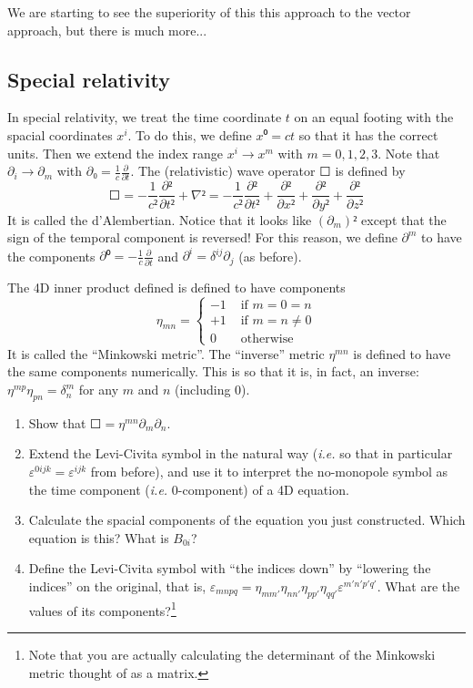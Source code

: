 We are starting to see the superiority of this this approach to the vector approach, but there is much more...

\subsection{Special relativity}
In special relativity, we treat the time coordinate $t$ on an equal footing with the spacial coordinates $x^i$. To do this, we define $x⁰ = ct$ so that it has the correct units. Then we extend the index range $x^i → x^m$ with $m=0,1,2,3$. Note that $∂_i → ∂_m$ with $∂₀ = \frac1c \frac ∂{∂t}$. The (relativistic) wave operator $☐$ is defined by 
$$
☐ = -\frac1 {c²} \frac {∂²}{∂t²} + ∇² 
= -\frac1 {c²} \frac {∂²}{∂t²} + \frac {∂²}{∂x²}+\frac {∂²}{∂y²}+\frac {∂²}{∂z²}
$$
It is called the d'Alembertian.
Notice that it looks like $(∂_m)²$ except that the sign of the temporal component is reversed! For this reason, we define $∂^m$ to have the components $∂⁰ = - \frac1c \frac ∂{∂t}$ and $∂^i = δ^{ij} ∂_j$ (as before). 

The 4D inner product defined is defined to have components
$$
η_{mn} = \begin{cases}
	-1 & \textrm{ if } m=0=n \\
	+1 & \textrm{ if } m=n ≠ 0\\
	0 &\textrm{ otherwise }
\end{cases}
$$
It is called the “Minkowski metric”. The “inverse'' metric $η^{mn}$ is defined to have the same components numerically. This is so that it is, in fact, an inverse: $η^{mp}η_{pn} = δ^m_n$ for any $m$ and $n$ (including 0).
\begin{exercise}
\begin{enumerate}
	\item Show that $☐ = η^{mn} ∂_m ∂_n$. 
	\item Extend the Levi-Civita symbol in the natural way ({\it i.e.} so that in particular $ε^{0ijk} =ε^{ijk}$ from before), and use it to interpret the no-monopole symbol as the time component ({\it i.e.} 0-component) of a 4D equation. 
	\item Calculate the spacial components of the equation you just constructed. Which equation is this? What is $B_{0i}$?
	\item Define the Levi-Civita symbol with “the indices down” by “lowering the indices” on the original, that is, $ε_{mnpq} = η_{mm'}η_{nn'} η_{pp'}η_{qq'}ε^{m'n'p'q'}$. What are the values of its components?\footnote{Note that you are actually calculating the determinant of the Minkowski metric thought of as a matrix.}
\end{enumerate}
\end{exercise}

